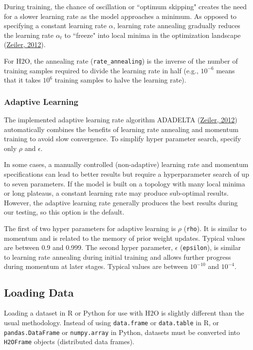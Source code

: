 During training, the chance of oscillation or ``optimum skipping" creates the need for a slower learning rate as the model approaches a minimum. As opposed to specifying a constant learning rate $\alpha$, learning rate annealing gradually reduces the learning rate $\alpha_t$ to ``freeze" into local minima in the optimization landscape (\href{http://arxiv.org/pdf/1212.5701v1.pdf}{Zeiler, 2012}).  

For H2O, the annealing rate (\texttt{rate\_annealing}) is the inverse of the number of training samples required to divide the learning rate in half (e.g., $10^{-6}$ means that it takes $10^6$ training samples to halve the learning rate).

\subsubsection{Adaptive Learning} 
\label{sssec:AdaptiveLearning}
The implemented adaptive learning rate algorithm ADADELTA (\href{http://arxiv.org/pdf/1212.5701v1.pdf}{Zeiler, 2012})  automatically combines the benefits of learning rate annealing and momentum training to avoid slow convergence. To simplify hyper parameter search, specify only $\rho$ and $\epsilon$. 

In some cases, a manually controlled (non-adaptive) learning rate and momentum specifications can lead to better results but require a hyperparameter search of up to seven parameters. If the model is built on a topology with many local minima or long plateaus, a constant learning rate may produce sub-optimal results. However, the adaptive learning rate generally produces the best results during our testing, so this option is the default. 

The first of two hyper parameters for adaptive learning is $\rho$ (\texttt{rho}). It is similar to momentum and is related to the memory of prior weight updates. Typical values are between 0.9 and 0.999. The second hyper parameter, $\epsilon$ (\texttt{epsilon}), is similar to learning rate annealing during initial training and allows further progress during momentum at later stages.
Typical values are between $10^{-10}$ and $10^{-4}$.

\subsection{Loading Data} 

Loading a dataset in R or Python for use with H2O is slightly different than the usual methodology.  Instead of using \texttt{data.frame} or \texttt{data.table} in R, or \texttt{pandas.DataFrame} or \texttt{numpy.array} in Python, datasets must be converted into \texttt{H2OFrame} objects (distributed data frames). 

